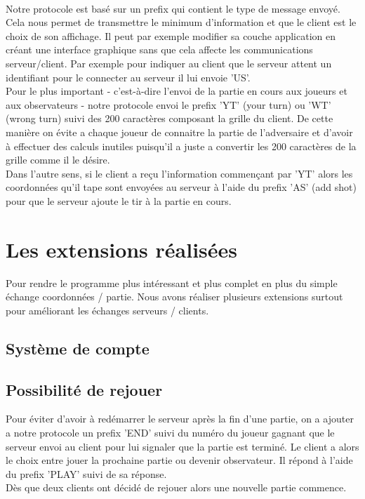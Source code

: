 \documentclass[12pt]{article}
\begin{document}
\textnormal{
\\Notre protocole est basé sur un prefix qui contient le type de message envoyé. Cela nous permet de transmettre le minimum d'information et que le client est le choix de son affichage. Il peut par exemple modifier sa couche application en créant une interface graphique sans que cela affecte les communications serveur/client. Par exemple pour indiquer au client que le serveur attent un identifiant pour le connecter au serveur il lui envoie 'US'.\\
Pour le plus important - c'est-à-dire l'envoi de la partie en cours aux joueurs et aux observateurs - notre protocole envoi le prefix 'YT' (your turn) ou 'WT' (wrong turn) suivi des 200 caractères composant la grille du client. De cette manière on évite a chaque joueur de connaitre la partie de l'adversaire et d'avoir à effectuer des calculs inutiles puisqu'il a juste a convertir les 200 caractères de la grille comme il le désire.\\
Dans l'autre sens, si le client a reçu l'information commençant par 'YT' alors les coordonnées qu'il tape sont envoyées au serveur à l'aide du prefix 'AS' (add shot) pour que le serveur ajoute le tir à la partie en cours.}

\section{Les extensions réalisées}

\textnormal{
Pour rendre le programme plus intéressant et plus complet en plus du simple échange coordonnées / partie. Nous avons réaliser plusieurs extensions surtout pour améliorant les échanges serveurs / clients.
}

\subsection{Système de compte}

\subsection{Possibilité de rejouer}
\textnormal{
Pour éviter d'avoir à redémarrer le serveur après la fin d'une partie, on a ajouter a notre protocole un prefix 'END' suivi du numéro du joueur gagnant que le serveur envoi au client pour lui signaler que la partie est terminé. Le client a alors le choix entre jouer la prochaine partie ou devenir observateur. Il répond à l'aide du prefix 'PLAY' suivi de sa réponse.\\
Dès que deux clients ont décidé de rejouer alors une nouvelle partie commence.
}
\end{document}
